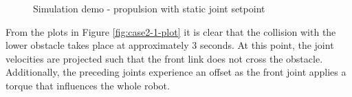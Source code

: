 \begin{figure}[H]
    \hfil

    \caption{Simulation demo - propulsion with static joint setpoint}
    \label{fig:case2-1}
\end{figure}



From the plots in Figure \ref{fig:case2-1-plot} it is clear that the collision with the lower obstacle takes place at approximately 3 seconds. At this point, the joint velocities are projected such that the front link does not cross the obstacle. Additionally, the preceding joints experience an offset as the front joint applies a torque that influences the whole robot.

